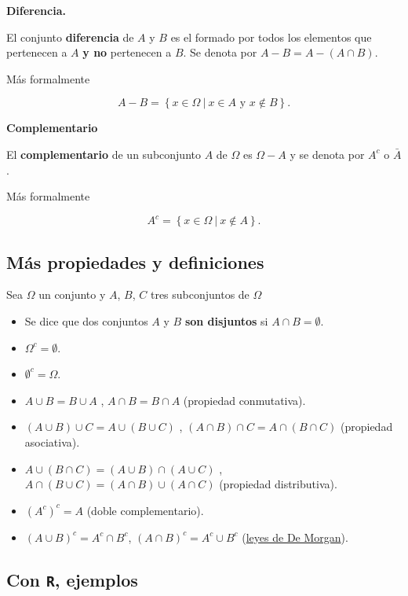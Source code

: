 \documentclass[
  letterpaper,
  DIV=11,
  numbers=noendperiod]{scrreprt}
\providecommand{\tightlist}{%
  \setlength{\itemsep}{0pt}\setlength{\parskip}{0pt}}\usepackage{longtable,booktabs,array}
\begin{document}
\textbf{Diferencia.}

El conjunto \textbf{diferencia} de \(A\) y \(B\) es el formado por todos
los elementos que pertenecen a \(A\) \textbf{y no} pertenecen a \(B\).
Se denota por \(A-B=A-(A\cap B)\).

Más formalmente

\[
A- B=\left\{x\in\Omega \ \big|\ x\in A \mbox{ y } x\notin B\right\}.
\]

\textbf{Complementario}

El \textbf{complementario} de un subconjunto \(A\) de \(\Omega\) es
\(\Omega-A\) y se denota por \(A^c\) o \(\bar{A}\).

Más formalmente

\[
A^c=\left\{x\in\Omega \ \big|\  x\not\in A\right\}.
\]

\hypertarget{muxe1s-propiedades-y-definiciones}{%
\subsection{Más propiedades y
definiciones}\label{muxe1s-propiedades-y-definiciones}}

Sea \(\Omega\) un conjunto y \(A\), \(B\), \(C\) tres subconjuntos de
\(\Omega\)

\begin{itemize}
\tightlist
\item
  Se dice que dos conjuntos \(A\) y \(B\) \textbf{son disjuntos} si
  \(A\cap B=\emptyset.\)
\item
  \(\Omega^c=\emptyset\).
\item
  \(\emptyset^c=\Omega\).
\item
  \(A\cup B=B \cup A\) , \(A\cap B=B\cap A\) (propiedad conmutativa).
\item
  \((A\cup B) \cup C = A \cup( B \cup C)\) ,
  \((A\cap B) \cap C = A \cap( B \cap C)\) (propiedad asociativa).
\item
  \(A\cup (B\cap C)=(A\cup B) \cap (A\cup C)\) ,
  \(A\cap (B\cup C)=(A\cap B) \cup (A\cap C)\) (propiedad distributiva).
\item
  \(\left(A^c\right)^c=A\) (doble complementario).
\item
  \(\left(A\cup B\right)^c=A^c \cap B^c\),
  \(\left(A\cap B\right)^c=A^c \cup B^c\)
  (\href{https://es.wikipedia.org/wiki/Leyes_de_De_Morgan}{leyes de De
  Morgan}).
\end{itemize}

\hypertarget{con-r-ejemplos}{%
\subsection{\texorpdfstring{Con \texttt{R},
ejemplos}{Con R, ejemplos}}\label{con-r-ejemplos}}
\end{document}
